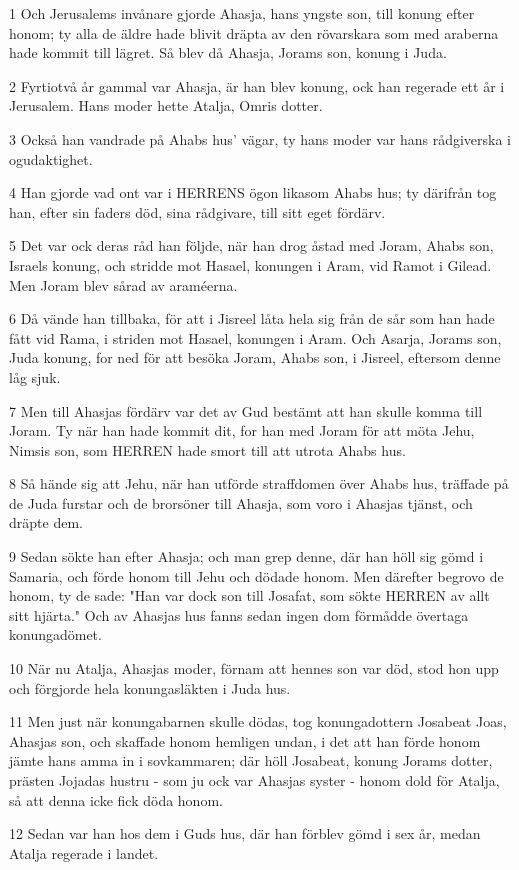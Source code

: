 \par 1 Och Jerusalems invånare gjorde Ahasja, hans yngste son, till konung efter honom; ty alla de äldre hade blivit dräpta av den rövarskara som med araberna hade kommit till lägret. Så blev då Ahasja, Jorams son, konung i Juda.
\par 2 Fyrtiotvå år gammal var Ahasja, är han blev konung, ock han regerade ett år i Jerusalem. Hans moder hette Atalja, Omris dotter.
\par 3 Också han vandrade på Ahabs hus' vägar, ty hans moder var hans rådgiverska i ogudaktighet.
\par 4 Han gjorde vad ont var i HERRENS ögon likasom Ahabs hus; ty därifrån tog han, efter sin faders död, sina rådgivare, till sitt eget fördärv.
\par 5 Det var ock deras råd han följde, när han drog åstad med Joram, Ahabs son, Israels konung, och stridde mot Hasael, konungen i Aram, vid Ramot i Gilead. Men Joram blev sårad av araméerna.
\par 6 Då vände han tillbaka, för att i Jisreel låta hela sig från de sår som han hade fått vid Rama, i striden mot Hasael, konungen i Aram. Och Asarja, Jorams son, Juda konung, for ned för att besöka Joram, Ahabs son, i Jisreel, eftersom denne låg sjuk.
\par 7 Men till Ahasjas fördärv var det av Gud bestämt att han skulle komma till Joram. Ty när han hade kommit dit, for han med Joram för att möta Jehu, Nimsis son, som HERREN hade smort till att utrota Ahabs hus.
\par 8 Så hände sig att Jehu, när han utförde straffdomen över Ahabs hus, träffade på de Juda furstar och de brorsöner till Ahasja, som voro i Ahasjas tjänst, och dräpte dem.
\par 9 Sedan sökte han efter Ahasja; och man grep denne, där han höll sig gömd i Samaria, och förde honom till Jehu och dödade honom. Men därefter begrovo de honom, ty de sade: "Han var dock son till Josafat, som sökte HERREN av allt sitt hjärta." Och av Ahasjas hus fanns sedan ingen dom förmådde övertaga konungadömet.
\par 10 När nu Atalja, Ahasjas moder, förnam att hennes son var död, stod hon upp och förgjorde hela konungasläkten i Juda hus.
\par 11 Men just när konungabarnen skulle dödas, tog konungadottern Josabeat Joas, Ahasjas son, och skaffade honom hemligen undan, i det att han förde honom jämte hans amma in i sovkammaren; där höll Josabeat, konung Jorams dotter, prästen Jojadas hustru - som ju ock var Ahasjas syster - honom dold för Atalja, så att denna icke fick döda honom.
\par 12 Sedan var han hos dem i Guds hus, där han förblev gömd i sex år, medan Atalja regerade i landet.

